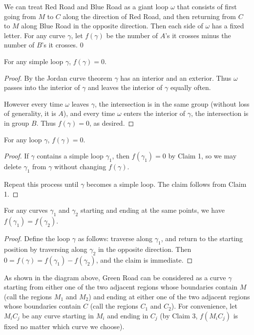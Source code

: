 We can treat Red Road and Blue Road as a giant loop $\omega$ that consists of first going from $M$ to $C$ along the direction of Red Road, and then returning from $C$ to $M$ along Blue Road in the opposite direction. Then each side of $\omega$ has a fixed letter. For any curve $\gamma$, let $f(\gamma)$ be the number of $A$'s it crosses minus the number of $B$'s it crosses.
\setcounter{iclaim}0
\begin{iclaim}
    For any simple loop $\gamma$, $f(\gamma)=0$.
\end{iclaim}
\begin{proof}
    By the Jordan curve theorem $\gamma$ has an interior and an exterior. Thus $\omega$ passes into the interior of $\gamma$ and leaves the interior of $\gamma$ equally often.

    However every time $\omega$ leaves $\gamma$, the intersection is in the same group (without loss of generality, it is $A$), and every time $\omega$ enters the interior of $\gamma$, the intersection is in group $B$. Thus $f(\gamma)=0$, as desired.
\end{proof}
\begin{iclaim}
    For any loop $\gamma$, $f(\gamma)=0$.
\end{iclaim}
\begin{proof}
    If $\gamma$ contains a simple loop $\gamma_1$, then $f(\gamma_1)=0$ by Claim 1, so we may delete $\gamma_1$ from $\gamma$ without changing $f(\gamma)$.

    Repeat this process until $\gamma$ becomes a simple loop. The claim follows from Claim 1.
\end{proof}
\begin{iclaim}
    For any curves $\gamma_1$ and $\gamma_2$ starting and ending at the same points, we have $f(\gamma_1)=f(\gamma_2)$.
\end{iclaim}
\begin{proof}
    Define the loop $\gamma$ as follows: traverse along $\gamma_1$, and return to the starting position by traversing along $\gamma_2$ in the opposite direction. Then $0=f(\gamma)=f(\gamma_1)-f(\gamma_2)$, and the claim is immediate.
\end{proof}

As shown in the diagram above, Green Road can be considered as a curve $\gamma$ starting from either one of the two adjacent regions whose boundaries contain $M$ (call the regions $M_1$ and $M_2$) and ending at either one of the two adjacent regions whose boundaries contain $C$ (call the regions $C_1$ and $C_2$). For convenience, let $M_iC_j$ be any curve starting in $M_i$ and ending in $C_j$ (by Claim 3, $f(M_iC_j)$ is fixed no matter which curve we choose).

